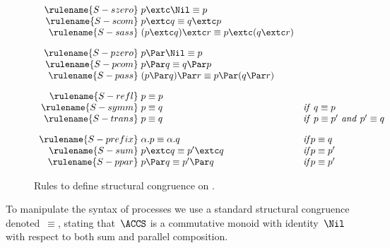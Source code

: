 \begin{figure}[t]
$$
\begin{array}{r@{\hskip 3pt}ll}

\\[1em]
\rulename{S-szero} & p \extc \Nil \equiv p \\
\rulename{S-scom} & p \extc q \equiv q \extc p \\
\rulename{S-sass} &  (p \extc q) \extc r \equiv p \extc (q \extc r)
\\[1em]
\rulename{S-pzero} & p \Par \Nil \equiv p \\
\rulename{S-pcom} & p \Par q \equiv q \Par p \\
\rulename{S-pass} &  ( p \Par q ) \Par r \equiv p \Par (q \Par r)
\\[1em]
\rulename{S-refl}& p \equiv p \\
\rulename{S-symm} & p \equiv q & \mathit{if} \ q \equiv p\\
\rulename{S-trans} & p \equiv q & \mathit{if} \ p \equiv p' \ \mathit{and} \ p' \equiv q
\\[1em]
\rulename{S-prefix} & \alpha.p \equiv \alpha.q  & \mathit{if} p \equiv q\\
\rulename{S-sum} & p \extc q \equiv p' \extc q & \mathit{if}  p \equiv p'\\
\rulename{S-ppar} & p \Par q \equiv p' \Par q & \mathit{if}  p \equiv p'
\end{array}
$$
\caption{Rules to define structural congruence on \ACCS.}
\label{fig:equiv}
\hrulefill
\end{figure}



To manipulate the syntax of processes we use
a standard structural congruence denoted~$\equiv$,
stating that~$\ACCS$ is a commutative monoid with identity~$\Nil$
with respect to both sum and parallel composition. %


